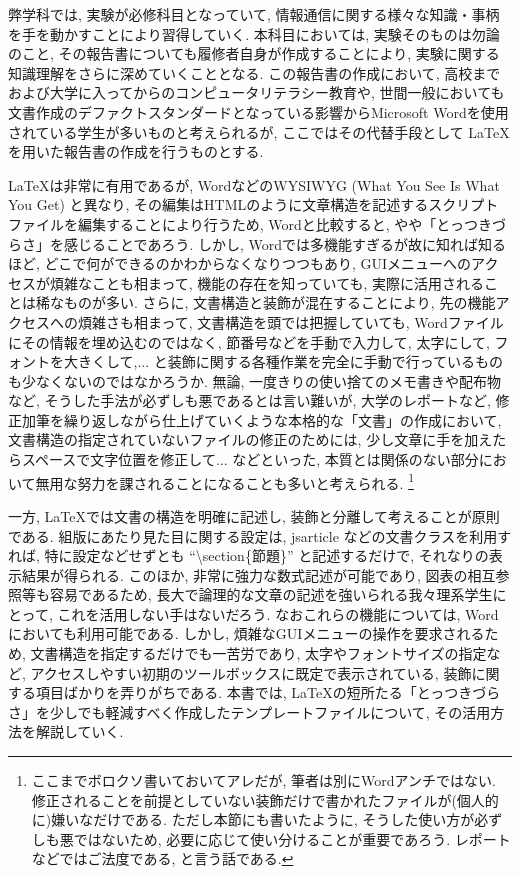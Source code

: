 

弊学科では, 実験が必修科目となっていて, 情報通信に関する様々な知識・事柄を手を動かすことにより習得していく.
本科目においては, 実験そのものは勿論のこと, その報告書についても履修者自身が作成することにより, 実験に関する知識理解をさらに深めていくこととなる.
この報告書の作成において, 高校までおよび大学に入ってからのコンピュータリテラシー教育や, 世間一般においても文書作成のデファクトスタンダードとなっている影響からMicrosoft Wordを使用されている学生が多いものと考えられるが,
ここではその代替手段として \LaTeX を用いた報告書の作成を行うものとする.

\LaTeX は非常に有用であるが, WordなどのWYSIWYG (What You See Is What You Get) と異なり,
その編集はHTMLのように文章構造を記述するスクリプトファイルを編集することにより行うため, Wordと比較すると, やや「とっつきづらさ」を感じることであろう.
しかし, Wordでは多機能すぎるが故に知れば知るほど, どこで何ができるのかわからなくなりつつもあり, GUIメニューへのアクセスが煩雑なことも相まって, 機能の存在を知っていても, 実際に活用されることは稀なものが多い.
さらに, 文書構造と装飾が混在することにより, 先の機能アクセスへの煩雑さも相まって, 文書構造を頭では把握していても, Wordファイルにその情報を埋め込むのではなく, 節番号などを手動で入力して,
太字にして, フォントを大きくして,... と装飾に関する各種作業を完全に手動で行っているものも少なくないのではなかろうか.
無論, 一度きりの使い捨てのメモ書きや配布物など, そうした手法が必ずしも悪であるとは言い難いが, 大学のレポートなど, 修正加筆を繰り返しながら仕上げていくような本格的な「文書」の作成において,
文書構造の指定されていないファイルの修正のためには, 少し文章に手を加えたらスペースで文字位置を修正して... などといった, 本質とは関係のない部分において無用な努力を課されることになることも多いと考えられる.
\footnote{
    ここまでボロクソ書いておいてアレだが, 筆者は別にWordアンチではない. 修正されることを前提としていない装飾だけで書かれたファイルが(個人的に)嫌いなだけである.
    ただし本節にも書いたように, そうした使い方が必ずしも悪ではないため, 必要に応じて使い分けることが重要であろう. レポートなどではご法度である, と言う話である.
}

一方, \LaTeX では文書の構造を明確に記述し, 装飾と分離して考えることが原則である.
組版にあたり見た目に関する設定は, jsarticle などの文書クラスを利用すれば, 特に設定などせずとも ``\textbackslash section\{節題\}'' と記述するだけで, それなりの表示結果が得られる.
このほか, 非常に強力な数式記述が可能であり, 図表の相互参照等も容易であるため, 長大で論理的な文章の記述を強いられる我々理系学生にとって, これを活用しない手はないだろう.
なおこれらの機能については, Word においても利用可能である. しかし, 煩雑なGUIメニューの操作を要求されるため, 文書構造を指定するだけでも一苦労であり, 太字やフォントサイズの指定など,
アクセスしやすい初期のツールボックスに既定で表示されている, 装飾に関する項目ばかりを弄りがちである.
本書では, \LaTeX の短所たる「とっつきづらさ」を少しでも軽減すべく作成したテンプレートファイルについて, その活用方法を解説していく.

